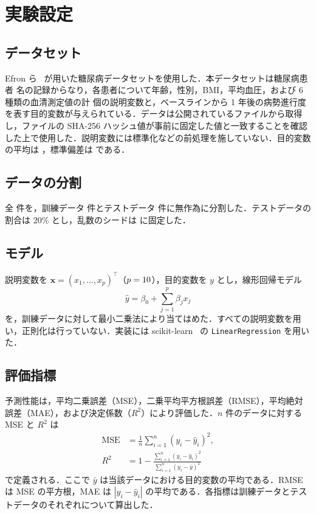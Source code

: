 \documentclass[9pt,a4paper,twocolumn]{ltjsarticle}
\begin{document}

\section{実験設定}

\subsection{データセット}
Efron ら~\cite{efron2004} が用いた糖尿病データセットを使用した．本データセットは糖尿病患者 \NSamples{} 名の記録からなり，各患者について年齢，性別，BMI，平均血圧，および 6 種類の血清測定値の計 \NFeatures{} 個の説明変数と，ベースラインから 1 年後の病勢進行度を表す目的変数が与えられている．データは公開されているファイルから取得し，ファイルの SHA-256 ハッシュ値が事前に固定した値と一致することを確認した上で使用した．説明変数には標準化などの前処理を施していない．目的変数の平均は \TargetMean{}，標準偏差は \TargetStd{} である．

\subsection{データの分割}
全 \NSamples{} 件を，訓練データ \NTrain{} 件とテストデータ \NTest{} 件に無作為に分割した．テストデータの割合は 20\% とし，乱数のシードは \Seed{} に固定した．

\subsection{モデル}
説明変数を $\boldsymbol{x} = (x_1, \dots, x_p)^\top$（$p = 10$），目的変数を $y$ とし，線形回帰モデル
\begin{equation}
  \hat{y} = \beta_0 + \sum_{j=1}^{p} \beta_j x_j
  \label{eq:model}
\end{equation}
を，訓練データに対して最小二乗法により当てはめた．すべての説明変数を用い，正則化は行っていない．実装には scikit-learn~\cite{sklearn} の \texttt{LinearRegression} を用いた．

\subsection{評価指標}
予測性能は，平均二乗誤差（MSE），二乗平均平方根誤差（RMSE），平均絶対誤差（MAE），および決定係数（$R^2$）により評価した．$n$ 件のデータに対する MSE と $R^2$ は
\begin{align}
  \mathrm{MSE} &= \frac{1}{n} \sum_{i=1}^{n} (y_i - \hat{y}_i)^2, \\
  R^2 &= 1 - \frac{\sum_{i=1}^{n} (y_i - \hat{y}_i)^2}{\sum_{i=1}^{n} (y_i - \bar{y})^2}
\end{align}
で定義される．ここで $\bar{y}$ は当該データにおける目的変数の平均である．RMSE は MSE の平方根，MAE は $|y_i - \hat{y}_i|$ の平均である．各指標は訓練データとテストデータのそれぞれについて算出した．
\end{document}
